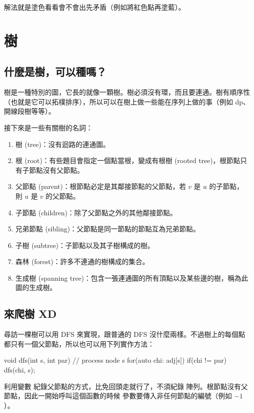 解法就是塗色看看會不會出先矛盾（例如將紅色點再塗藍）。


\section{樹}

\subsection{什麼是樹，可以種嗎？}

樹是一種特別的圖，它長的就像一顆樹。樹必須沒有環，而且要連通。樹有順序性（也就是它可以拓樸排序），所以可以在樹上做一些能在序列上做的事（例如 dp、開線段樹等等）。


接下來是一些有關樹的名詞：
\begin{enumerate}
\item 樹 (tree)：沒有迴路的連通圖。
\item 根 (root)：有些題目會指定一個點當根，變成有根樹 (rooted tree)，根節點只有子節點沒有父節點。
\item 父節點 (parent)：根節點必定是其鄰接節點的父節點，若 $v$ 是 $u$ 的子節點，則 $u$ 是 $v$ 的父節點。
\item 子節點 (children)：除了父節點之外的其他鄰接節點。
\item 兄弟節點 (sibling)：父節點是同一節點的節點互為兄弟節點。
\item 子樹 (subtree)：子節點以及其子樹構成的樹。
\item 森林 (forest)：許多不連通的樹構成的集合。
\item 生成樹 (spanning tree)：包含一張連通圖的所有頂點以及某些邊的樹，稱為此圖的生成樹。
\end{enumerate}

\subsection{來爬樹 XD}
尋訪一棵樹可以用 DFS 來實現，跟普通的 DFS 沒什麼兩樣。不過樹上的每個點都只有一個父節點，所以也可以用下列實作方法：
\begin{C++}
void dfs(int s, int par){
	// process node s
	for(auto chi: adj[s]){
		if(chi != par)	 dfs(chi, s);
	}
}
\end{C++}
利用變數  紀錄父節點的方式，比免回頭走就行了，不須紀錄  陣列。根節點沒有父節點，因此一開始呼叫這個函數的時候  參數要傳入非任何節點的編號（例如 $-1$）。


